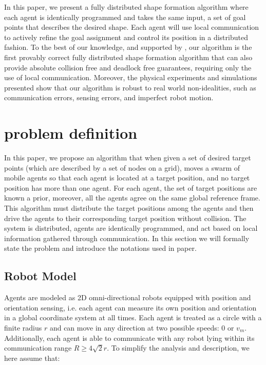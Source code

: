 \documentclass[journal]{IEEEtran}
\begin{document}
In this paper, we present a fully distributed shape formation algorithm where each agent is identically programmed and takes the same input, a set of goal points that describes the desired shape. Each agent will use local communication to actively refine the goal assignment and control its position in a distributed fashion. To the best of our knowledge, and supported by \cite{bufferedvonori}, our algorithm is the first provably correct fully distributed shape formation algorithm that can also provide absolute collision free and deadlock free guarantees, requiring only the use of local communication. Moreover, the physical experiments and simulations presented show that our algorithm is robust to real world non-idealities, such as communication errors, sensing errors, and imperfect robot motion.


\IEEEdisplaynontitleabstractindextext
\section{problem definition}
In this paper, we propose an algorithm that when given a set of desired target points (which are described by a set of nodes on a grid), moves a swarm of mobile agents so that each agent is located at a target position, and no target position has more than one agent. For each agent, the set of target positions are known a prior, moreover, all the agents agree on the same global reference frame. This algorithm must distribute the target positions among the agents and then drive the agents to their corresponding target position without collision. The system is distributed, agents are identically programmed, and act based on local information gathered through communication. In this section we will formally state the problem and introduce the notations used in paper. 

\subsection{Robot Model}

Agents are modeled as 2D omni-directional robots equipped with position and orientation sensing, i.e. each agent can measure its own position and orientation in a global coordinate system at all times. Each agent is treated as a circle with a finite radius $r$ and can move in any direction at two possible speeds: 0 or $v_m$. Additionally, each agent is able to communicate with any robot lying within its communication range $R\geq4\sqrt{2}r$. To simplify the analysis and description, we here assume that:
\end{document}
